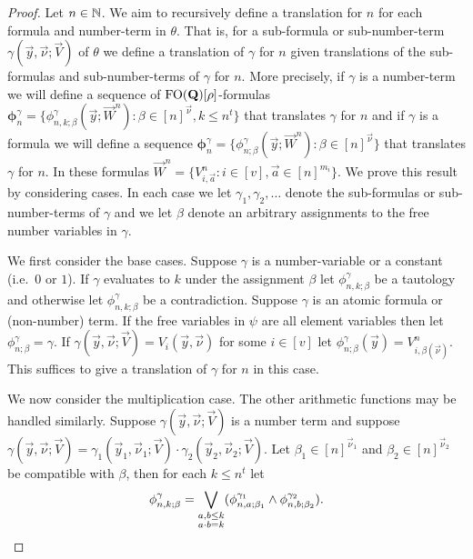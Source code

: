 \documentclass[../main/thesis.tex]{subfiles}
\begin{document}
\begin{proof}
  Let $n \in \mathbb{N}$. We aim to recursively define a translation for $n$ for each
  formula and number-term in $\theta$. That is, for a sub-formula or
  sub-number-term $\gamma(\vec{y}, \vec{\nu} ; \vec{V})$ of $\theta$ we define a
  translation of $\gamma$ for $n$ given translations of the sub-formulas and
  sub-number-terms of $\gamma$ for $n$. More precisely, if $\gamma$ is a
  number-term we will define a sequence of $\text{\upshape FO}(\mathbf{Q})[\rho]$-formulas
  $\boldsymbol{\phi}^{\gamma}_n = \{\phi^{\gamma}_{n, k; \beta}(\vec{y};
  \vec{W}^n) : \beta \in [n]^{\vec{\nu}}, k \leq n^t \}$ that translates
  $\gamma$ for $n$ and if $\gamma$ is a formula we will define a sequence
  $\boldsymbol{\phi}^{\gamma}_n = \{\phi^{\gamma}_{n ; \beta}(\vec{y};
  \vec{W}^n): \beta \in [n]^{\vec{\nu}} \}$ that translates $\gamma$ for $n$. In
  these formulas $\vec{W}^n = \{ V^n_{i, \vec{a}} : i \in [v], \vec{a} \in
  [n]^{m_i}\}$. We prove this result by considering cases. In each case we let
  $\gamma_1, \gamma_2, \ldots$ denote the sub-formulas or sub-number-terms of
  $\gamma$ and we let $\beta$ denote an arbitrary assignments to the free number
  variables in $\gamma$.

  We first consider the base cases. Suppose $\gamma$ is a number-variable or a
  constant (i.e.\ $0$ or $1$). If $\gamma$ evaluates to $k$ under the assignment
  $\beta$ let $\phi^{\gamma}_{n, k; \beta}$ be a tautology and otherwise let
  $\phi^{\gamma}_{n, k; \beta}$ be a contradiction. Suppose $\gamma$ is an
  atomic formula or (non-number) term. If the free variables in $\psi$ are all
  element variables then let $\phi^{\gamma}_{n; \beta} = \gamma$. If
  $\gamma(\vec{y}, \vec{\nu}; \vec{V}) = V_i(\vec{y}, \vec{\nu})$ for some $i
  \in [v]$ let $\phi^{\gamma}_{n; \beta}(\vec{y}) = V^n_{i, \beta(\vec{\nu})}$.
  This suffices to give a translation of $\gamma$ for $n$ in this case.

  We now consider the multiplication case. The other arithmetic functions may be
  handled similarly. Suppose $\gamma(\vec{y}, \vec{\nu}; \vec{V})$ is a number
  term and suppose $\gamma(\vec{y}, \vec{\nu}; \vec{V}) = \gamma_1(\vec{y}_1,
  \vec{\nu}_1; \vec{V}) \cdot \gamma_2(\vec{y}_2, \vec{\nu}_2; \vec{V})$. Let
  $\beta_1 \in [n]^{\vec{\nu}_1}$ and $\beta_2 \in [n]^{\vec{\nu}_2}$ be
  compatible with $\beta$, then for each $k \leq n^{t}$ let
  \begin{align*}
    \phi^{\gamma}_{n, k ; \beta} =
    \underset{\substack{a, b \leq k \\  a \cdot b = k}}{\bigvee}(\phi^{\gamma_1}_{n, a;
    \beta_1} \land \phi^{\gamma_2}_{n, b; \beta_2}).
  \end{align*}


\end{proof}
\end{document}
